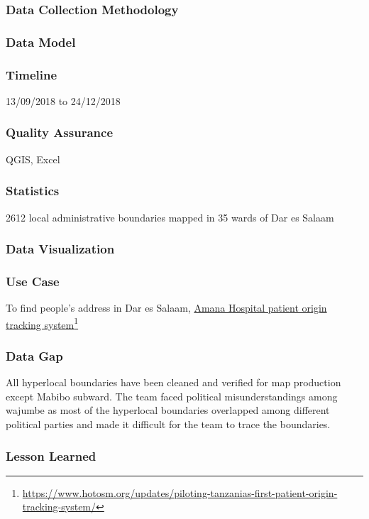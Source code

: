 \documentclass[a4paper,12pt,twoside]{article}
\begin{document}
\subsubsection{Data Collection Methodology}

\subsubsection{Data Model}

\subsubsection{Timeline}
13/09/2018 to 24/12/2018

\subsubsection{Quality Assurance}
QGIS, Excel

\subsubsection{Statistics}
2612 local administrative boundaries mapped in 35 wards of Dar es Salaam

\subsubsection{Data Visualization}

\subsubsection{Use Case}
To find people’s address in Dar es Salaam, \href{https://www.hotosm.org/updates/piloting-tanzanias-first-patient-origin-tracking-system/}{Amana Hospital patient origin tracking system}\footnote{\url{https://www.hotosm.org/updates/piloting-tanzanias-first-patient-origin-tracking-system/}}

\subsubsection{Data Gap}
All hyperlocal boundaries have been cleaned and verified for map production except Mabibo subward. The team faced political misunderstandings among wajumbe as most of the hyperlocal boundaries overlapped among different political parties and made it difficult for the team to trace the boundaries.

\subsubsection{Lesson Learned}
\end{document}
